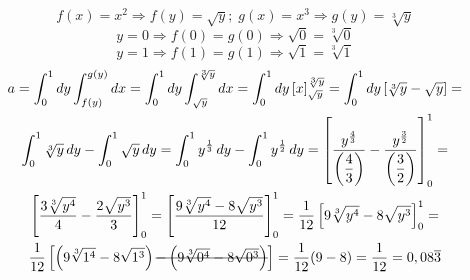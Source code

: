 \begin{enumerate}
	\begin{equation*}
		f(x) = x^2 \Rightarrow f(y) = \sqrt{y};\; g(x) = x^3 \Rightarrow g(y) = \sqrt[3]{y}
	\end{equation*}
	\begin{equation*}
		y = 0 \Rightarrow f(0) = g(0) \Rightarrow \sqrt{0} = \sqrt[3]{0}
	\end{equation*}
	\begin{equation*}
		y = 1 \Rightarrow f(1) = g(1) \Rightarrow \sqrt{1} = \sqrt[3]{1}
	\end{equation*}
	\begin{gather*}
		a = \int_0^1 dy \int_{f(y)}^{g(y)} dx = \int_0^1 dy \int_{\sqrt{y}}^{\sqrt[3]{y}} dx = \int_0^1 dy\, [x]_{\sqrt{y}}^{\sqrt[3]{y}} = \int_0^1 dy \left[\sqrt[3]{y} - \sqrt{y}\right] =\\ \int_0^1 \sqrt[3]{y}\, dy - \int_0^1 \sqrt{y}\, dy = \int_0^1 y^{\frac{1}{3}}\, dy - \int_0^1 y^{\frac{1}{2}}\, dy = \left[\dfrac{y^{\frac{4}{3}}}{\left(\dfrac{4}{3}\right)} - \dfrac{y^{\frac{3}{2}}}{\left(\dfrac{3}{2}\right)}\right]_0^1 =\\ \left[\dfrac{3 \sqrt[3]{y^4}}{4} - \dfrac{2 \sqrt{y^3}}{3}\right]_0^1 = \left[\dfrac{9 \sqrt[3]{y^4} - 8 \sqrt{y^3}}{12}\right]_0^1 = \dfrac{1}{12}\left[9 \sqrt[3]{y^4} - 8 \sqrt{y^3}\right]_0^1 =\\ \dfrac{1}{12}\left[\left(9 \sqrt[3]{1^4} - 8 \sqrt{1^3}\right) \overstrike{-\left(9 \sqrt[3]{0^4} - 8 \sqrt{0^3}\right)}\right] = \dfrac{1}{12}(9 - 8) = \dfrac{1}{12} = 0,08\overline{3}
	\end{gather*}
\end{enumerate}